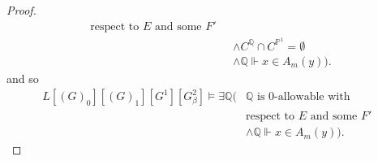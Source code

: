 \documentclass[10pt,a4paper]{amsart}
\newcommand{\forceP}{\mathbb{P}}
\newcommand{\forceQ}{\mathbb{Q}}
\begin{document}
\begin{proof}
\begin{align*}
\text{respect to } E \text{ and some $F'$ }  \\&  \land C^{\forceQ} \cap C^{\forceP^1}=\emptyset \\& \land
\forceQ \Vdash {x} \in A_m({y})).
\end{align*}
and so
\begin{align*}
L[(G)_0] [(G)_1] [G^1] [G^2_{\beta}] \models  \exists \forceQ (&\forceQ \text{ is } 0 \text{-allowable with} \\&
\text{respect to } E \text{ and some $F'$ }  \\&  \land
\forceQ \Vdash {x} \in A_m({y})).
\end{align*}






 
 




\end{proof}
\end{document}
